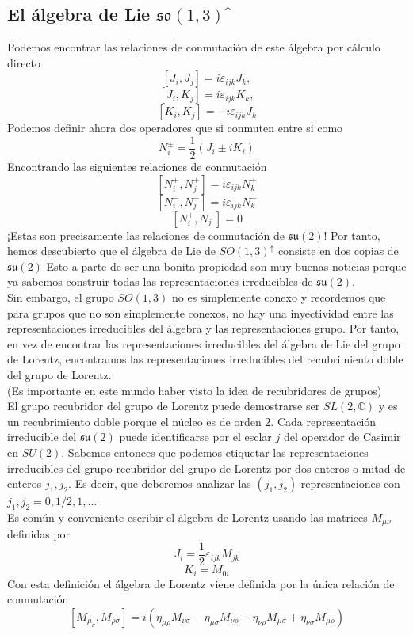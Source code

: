 \documentclass[12pt]{article}
\begin{document}
\subsection{El álgebra de Lie $\mathfrak{so(1,3)}^\uparrow$}
Podemos encontrar las relaciones de conmutación de este álgebra por cálculo directo
$$[J_i,J_j]=i\varepsilon_{ijk}J_k,$$ $$[J_i,K_j]=i\varepsilon_{ijk}K_k,$$ $$[K_i,K_j]=-i\varepsilon_{ijk}J_k$$
Podemos definir ahora dos operadores que si conmuten entre si como
$$N_i^{\pm}= \frac{1}{2}(J_i\pm iK_i)$$
Encontrando las siguientes relaciones de conmutación
$$[N_i^+,N_j^+]=i\varepsilon_{ijk}N_k^+$$
$$[N_i^-,N_j^-]=i\varepsilon_{ijk}N_k^-$$
$$[N_i^+,N_j^-]=0$$
¡Estas son precisamente las relaciones de conmutación de $\mathfrak{su(2)}$! Por tanto, hemos descubierto que el álgebra de Lie de $SO(1,3)^\uparrow$ consiste en dos copias de $\mathfrak{su(2)}$ Esto a parte de ser una bonita propiedad son muy buenas noticias porque ya sabemos construir todas las representaciones irreducibles de $\mathfrak{su(2)}$. \\ Sin embargo, el grupo $SO(1,3)$ no es simplemente conexo y recordemos que para grupos que no son simplemente conexos, no hay una inyectividad entre las representaciones irreducibles del álgebra y las representaciones grupo. Por tanto, en vez de encontrar las representaciones irreducibles del álgebra de Lie del grupo de Lorentz, encontramos las representaciones irreducibles del recubrimiento doble del grupo de Lorentz.\\
(Es importante en este mundo haber visto la idea de recubridores de grupos)\\
El grupo recubridor del grupo de Lorentz puede demostrarse ser $SL(2,\mathbb{C})$ y es un recubrimiento doble porque el núcleo es de orden $2$.
Cada representación irreducible del $\mathfrak{su(2)}$ puede identificarse por el esclar $j$ del operador de Casimir en $SU(2)$. Sabemos entonces que podemos etiquetar las representaciones irreducibles del grupo recubridor del grupo de Lorentz por dos enteros o mitad de enteros $j_1,j_2$. Es decir, que deberemos analizar las $(j_1,j_2)$ representaciones con $j_1,j_2=0,1/2,1,..$.\\
Es común y conveniente escribir el álgebra de Lorentz  usando las matrices $M_{\mu \nu}$ definidas por
$$J_i=\frac{1}{2}\varepsilon_{ijk}M_{jk}$$
$$K_i=M_{0i}$$
Con esta definición el álgebra de Lorentz viene definida por la única relación de conmutación
$$[M_{\mu_\nu},M_{\rho \sigma}]=i(\eta_{\mu \rho}M_{\nu\sigma}-\eta_{\mu \sigma}M_{\nu\rho}-\eta_{\nu\rho}M_{\mu\sigma}+\eta_{\nu \sigma}M_{\mu\rho})$$
\end{document}

